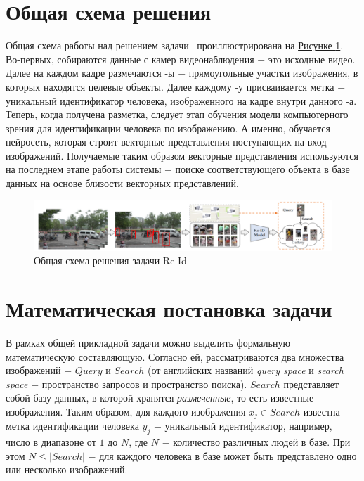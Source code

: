 \section{Общая схема решения}

Общая схема работы над решением задачи \reid\ проиллюстрирована на \hyperref[fig:general_pipeline]{Рисунке \ref*{fig:general_pipeline}}. Во-первых, собираются данные с камер видеонаблюдения $-$ это исходные видео. Далее на каждом кадре размечаются \textit{\bbox}-ы $-$ прямоугольные участки изображения, в которых находятся целевые объекты. Далее каждому \bbox-у присваивается метка $-$ уникальный идентификатор человека, изображенного на кадре внутри данного \bbox-а. Теперь, когда получена разметка, следует этап обучения модели компьютерного зрения для идентификации человека по изображению. А именно, обучается нейросеть, которая строит векторные представления поступающих на вход изображений. Получаемые таким образом векторные представления используются на последнем этапе работы системы $-$ поиске соответствующего объекта в базе данных на основе близости векторных представлений.

\begin{figure}[ht]
    \centering
    \includegraphics[width=\textwidth]{images/reid_problem/general_pipeline.png}
    \caption{Общая схема решения задачи Re-Id \cite{ye2021deep}}
    \label{fig:general_pipeline}
\end{figure}

\section{Математическая постановка задачи}

В рамках общей прикладной задачи можно выделить формальную математическую составляющую. Согласно ей, рассматриваются два множества изображений $-$ $Query$ и $Search$ (от английских названий \textit{query space} и \textit{search space} $-$ пространство запросов и пространство поиска). $Search$ представляет собой базу данных, в которой хранятся \textit{размеченные}, то есть известные изображения. Таким образом, для каждого изображения $x_j \in Search$ известна метка идентификации человека $y_j$ $-$ уникальный идентификатор, например, число в диапазоне от $1$ до $N$, где $N$ $-$ количество различных людей в базе. При этом $N \leqslant |Search|$ $-$ для каждого человека в базе может быть представлено одно или несколько изображений.

